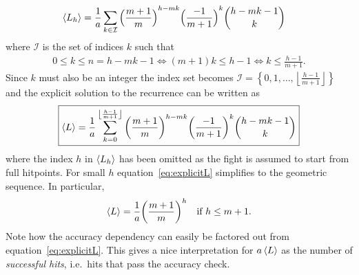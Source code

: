 \begin{align}
    \left\langle L_h \right\rangle &= \frac{1}{a}\sum_{k \in \mathcal{I}} {\Big(\frac{m+1}{m}\Big)}^{h-mk} {\Big(\frac{-1}{m+1}\Big)}^k {h-mk-1 \choose k} \nonumber
\end{align}
where $\mathcal{I}$ is the set of indices $k$ such that
\begin{align*}
    0 \leq k \leq n = h-mk-1
    \iff (m+1)k \leq h-1
    \iff k \leq \frac{h-1}{m+1}.
\end{align*}
Since $k$ must also be an integer the index set becomes $\mathcal{I} = \left\{0,1,\ldots,\left\lfloor{\frac{h-1}{m+1}}\right\rfloor\right\}$ and the explicit solution to the recurrence can be written as
\begin{align}
	\boxed{\left\langle L \right\rangle
		= \frac{1}{a}
		\sum_{k=0}^{\left\lfloor{\frac{h-1}{m+1}}\right\rfloor} {\left(\frac{m+1}{m}\right)}^{h-mk} {\left(\frac{-1}{m+1}\right)}^k {h-mk-1 \choose k}
	}\label{eq:explicitL}
\end{align}
where the index $h$ in $\left\langle L_h \right\rangle$ has been omitted as the fight is assumed to start from full hitpoints.
For small $h$ equation~\ref{eq:explicitL} simplifies to the geometric sequence. In particular,
\begin{align}
	\left\langle L \right\rangle
		= \frac{1}{a}{\left(\frac{m+1}{m}\right)}^h \quad \mbox{if }h \leq m+1.
	\label{eq:geomL}
\end{align}
Note how the accuracy dependency can easily be factored out from equation~\ref{eq:explicitL}. This gives a nice interpretation for $a\left\langle L \right\rangle$ as the number of \emph{successful hits}, i.e.~hits that pass the accuracy check.
